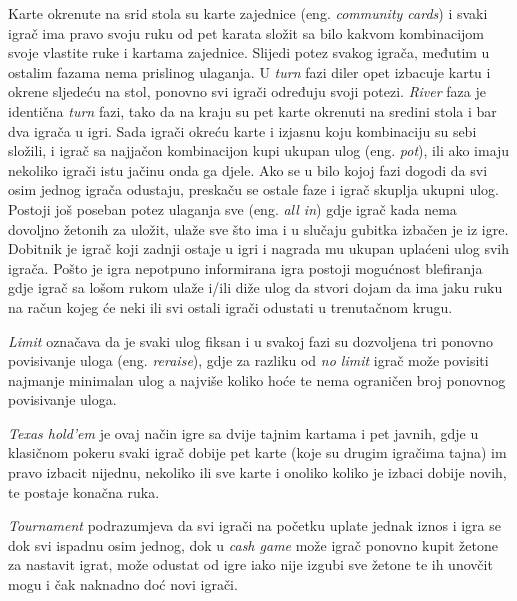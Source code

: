 Karte okrenute na srid stola su karte zajednice (eng. \textit{community cards}) i svaki igrač ima pravo svoju ruku od pet karata složit sa bilo kakvom kombinacijom svoje vlastite ruke i kartama zajednice. Slijedi potez svakog igrača, međutim u ostalim fazama nema prislinog ulaganja. U \emph{turn} fazi diler opet izbacuje kartu i okrene sljedeću na stol, ponovno svi igrači određuju svoji potezi. \emph{River} faza je identična \emph{turn} fazi, tako da na kraju su pet karte okrenuti na sredini stola i bar dva igrača u igri. Sada igrači okreću karte i izjasnu koju kombinaciju su sebi složili, i igrač sa najjačon kombinacijon kupi ukupan ulog (eng. \textit{pot}), ili ako imaju nekoliko igrači istu jačinu onda ga djele. Ako se u bilo kojoj fazi dogodi da svi osim jednog igrača odustaju, preskaču se ostale faze i igrač skuplja ukupni ulog. Postoji još poseban potez ulaganja sve (eng. \textit{all in}) gdje igrač kada nema dovoljno žetonih za uložit, ulaže sve što ima i u slučaju gubitka izbačen je iz igre. Dobitnik je igrač koji zadnji ostaje u igri i nagrada mu ukupan uplaćeni ulog svih igrača. Pošto je igra nepotpuno informirana igra postoji mogućnost blefiranja gdje igrač sa lošom rukom ulaže i/ili diže ulog da stvori dojam da ima jaku ruku na račun kojeg će neki ili svi ostali igrači odustati u trenutačnom krugu.


\emph{Limit} označava da je svaki ulog fiksan i u svakoj fazi su dozvoljena tri ponovno povisivanje uloga (eng. \textit{reraise}), gdje za razliku od \emph{no limit} igrač može povisiti najmanje minimalan ulog a najviše koliko hoće te nema ograničen broj ponovnog povisivanje uloga.

\emph{Texas hold'em} je ovaj način igre sa dvije tajnim kartama i pet javnih, gdje u klasičnom pokeru svaki igrač dobije pet karte (koje su drugim igračima tajna) im pravo izbacit nijednu, nekoliko ili sve karte i onoliko koliko je izbaci dobije novih, te postaje konačna ruka.

\emph{Tournament} podrazumjeva da svi igrači na početku uplate jednak iznos i igra se dok svi ispadnu osim jednog, dok u \emph{cash game} može igrač ponovno kupit žetone za nastavit igrat, može odustat od igre 
iako nije izgubi sve žetone te ih unovčit mogu i čak naknadno doć novi igrači.